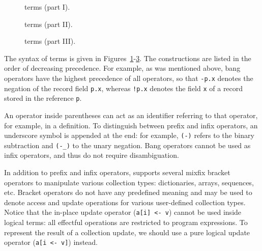 \begin{figure}[p!]
\begin{center}\end{center}
\caption{\whyml terms (part I).}
\label{fig:bnf:term1}
\end{figure}

\begin{figure}[ht]
\begin{center}\end{center}
\caption{\whyml terms (part II).}
\label{fig:bnf:term2}
\end{figure}

\begin{figure}[ht]
\begin{center}\end{center}
\caption{\whyml terms (part III).}
\label{fig:bnf:term3}
\end{figure}

The syntax of \whyml terms is given in
Figures~\ref{fig:bnf:term1}-\ref{fig:bnf:term3}.
The constructions are listed in the order of
decreasing precedence.
For example, as was mentioned above,
bang operators have the highest precedence of all operators,
so that \texttt{-p.x} denotes the negation of the
record field \texttt{p.x}, whereas \texttt{!p.x}
denotes the field \texttt{x} of a record stored
in the reference \texttt{p}.

An operator inside parentheses can act as an identifier
referring to that operator, for example, in a definition.
To distinguish between prefix and infix operators, an
underscore symbol is appended at the end: for example,
\texttt{(-)} refers to the binary subtraction and
\texttt{(-\_)} to the unary negation.
Bang operators cannot be used as infix operators,
and thus do not require disambiguation.

In addition to prefix and infix operators, \whyml
supports several mixfix bracket operators to
manipulate various collection types: dictionaries,
arrays, sequences, etc. Bracket operators do not have
any predefined meaning and may be used to denote access
and update operations for various user-defined collection types.
Notice that the in-place update operator (\texttt{a[i] <- v})
cannot be used inside logical terms: all effectful operations
are restricted to program expressions. To represent the result
of a collection update, we should use a pure logical update
operator (\texttt{a[i <- v]}) instead.


